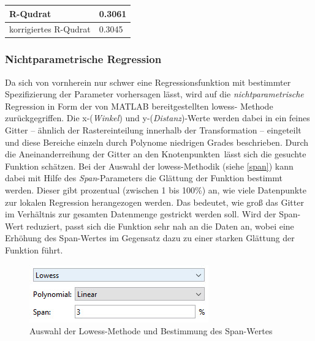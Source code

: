 \tablehead{}
\tabletail{}
\tablelasttail{}
\begin{center}%
\begin{supertabular}{ | P{6cm} | P{3cm}  |}
\textsf{R-Qudrat} 	& 0.3061	\\
\hline
\textsf{korrigiertes R-Qudrat} 	&  0.3045	\\
\hline
\end{supertabular}
\end{center}

\subsubsection{Nichtparametrische Regression}
\label{wdnr}
Da sich von vornherein nur schwer eine Regressionsfunktion mit bestimmter Spezifizierung der Parameter vorhersagen lässt, wird auf die \textit{nichtparametrische} Regression in Form der von MATLAB bereitgestellten \gls{lowess}- Methode zurückgegriffen. Die x-(\textit{Winkel}) und y-(\textit{Distanz})-Werte werden dabei in ein feines Gitter -- ähnlich der Rastereinteilung innerhalb der Transformation -- eingeteilt und diese Bereiche einzeln durch Polynome niedrigen Grades beschrieben. Durch die Aneinanderreihung der Gitter an den \glqq Knotenpunkten\grqq~lässt sich die gesuchte Funktion schätzen. Bei der Auswahl der \gls{lowess}-Methodik (siehe \vref{span}) kann dabei mit Hilfe des \textit{Span}-Parameters die Glättung der Funktion bestimmt werden. Dieser gibt prozentual (zwischen 1 bis 100\%) an, wie viele Datenpunkte zur lokalen Regression herangezogen werden. Das bedeutet, wie groß das Gitter im Verhältnis zur gesamten Datenmenge gestrickt werden soll. Wird der Span-Wert reduziert, passt sich die Funktion sehr nah an die Daten an, wobei eine Erhöhung des Span-Wertes im Gegensatz dazu zu einer starken Glättung der Funktion führt.

\begin{figure}[H]
\centering
\includegraphics[scale=0.9]{se-wa-jpg/span}
\caption{Auswahl der Lowess-Methode und Bestimmung des Span-Wertes}
\label{span}
\end{figure}

